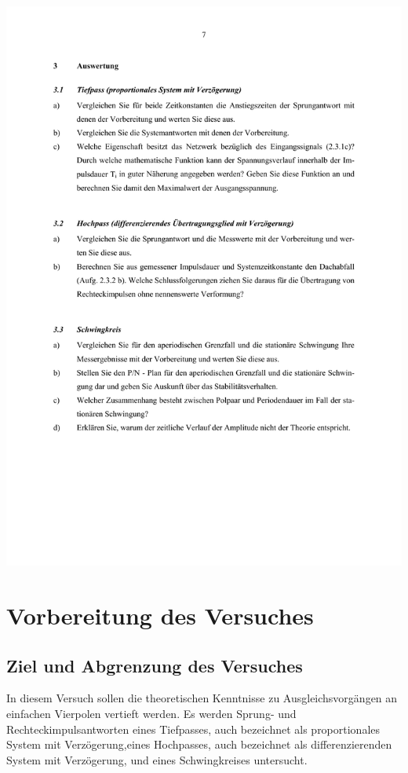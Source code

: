 \includegraphics[width=1.0\textwidth]{Bilder/Grundubertragungsglieder im Zeitbereich (verschoben) 7}\newpage


\section{Vorbereitung des Versuches}
\subsection{Ziel und Abgrenzung des Versuches}

In diesem Versuch sollen die theoretischen Kenntnisse zu Ausgleichsvorgängen an 
einfachen Vierpolen vertieft werden. Es werden Sprung- und Rechteckimpulsantworten eines 
Tiefpasses, auch bezeichnet als proportionales System mit Verzögerung,eines Hochpasses, 
auch bezeichnet als differenzierenden System mit Verzögerung, und eines Schwingkreises untersucht.\\
\newline

